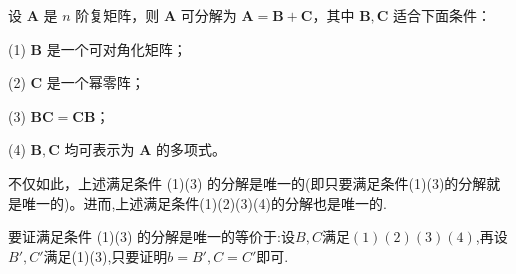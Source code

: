 \documentclass[../../main.tex]{subfiles}
\begin{document}
\begin{theorem}\label{theorem:Jordan-Chevalley分解}
设 $\boldsymbol{A}$ 是 $n$ 阶复矩阵，则 $\boldsymbol{A}$ 可分解为 $\boldsymbol{A} = \boldsymbol{B} + \boldsymbol{C}$，其中 $\boldsymbol{B}, \boldsymbol{C}$ 适合下面条件：

(1) $\boldsymbol{B}$ 是一个可对角化矩阵；

(2) $\boldsymbol{C}$ 是一个幂零阵；

(3) $\boldsymbol{BC} = \boldsymbol{CB}$；

(4) $\boldsymbol{B}, \boldsymbol{C}$ 均可表示为 $\boldsymbol{A}$ 的多项式。

不仅如此，上述满足条件 (1)(3) 的分解是唯一的(即只要满足条件(1)(3)的分解就是唯一的)。进而,上述满足条件(1)(2)(3)(4)的分解也是唯一的.
\end{theorem}
\begin{remark}
要证满足条件 (1)(3) 的分解是唯一的等价于:设$B,C$满足$(1)(2)(3)(4)$,再设$B',C'$满足(1)(3),只要证明$b=B',C=C'$即可.
\end{remark}
\end{document}
